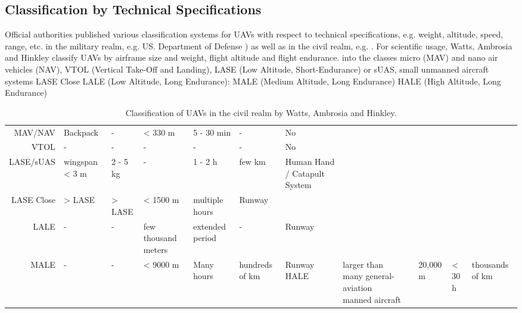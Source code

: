 \subsection{Classification by Technical Specifications}
Official authorities 
published various classification systems for UAVs
with respect to technical specifications,
e.g. weight, altitude, speed, range, etc.
in the military realm,
e.g. US. Department of Defense %
)
as well as in the civil realm,
e.g. 
.
For scientific usage,
Watts, Ambrosia and Hinkley classify UAVs
by airframe size and weight, flight altitude and flight endurance. \cite{Watts2012}
into the classes
micro (MAV) and nano air vehicles (NAV),
VTOL (Vertical Take-Off and Landing),
LASE (Low Altitude, Short-Endurance) or sUAS, small unmanned aircraft systems
LASE Close
LALE (Low Altitude, Long Endurance):
MALE (Medium Altitude, Long Endurance)
HALE (High Altitude, Long Endurance)


\begin{table}
    \caption{Classification of UAVs in the civil realm by Watts, Ambrosia and Hinkley. \cite{Watts2012}}
    \label{tab:CivilRealmClassificationUAV}
    \centering
    \begin{tabular}{r l l l}
    \toprule
     &  &  &  &  &  &  \\
    \midrule
    MAV/NAV & Backpack & - & < 330 m & 5 - 30 min & - & No\\
    VTOL & - & - & - & - & - & No\\
    LASE/sUAS & wingspan < 3 m & 2 - 5 kg & - & 1 - 2 h & few km & Human Hand / Catapult System \\
    LASE Close & > LASE & > LASE & < 1500 m & multiple hours & Runway\\
    LALE & - & - & few thousand meters & extended period & - & Runway\\
    MALE & - & - & < 9000 m & Many hours & hundreds of km & Runway
    HALE & larger than many general-aviation manned aircraft & & 20,000 m & < 30 h & thousands of km 

    \bottomrule\\
    \end{tabular}
\end{table}






